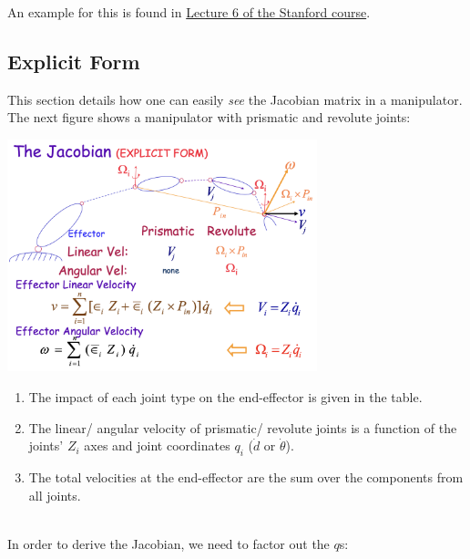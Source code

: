 An example for this is found in \href{https://youtu.be/fwHc0a8DMQ0?t=4040}{Lecture 6 of the Stanford course}.

\subsection{Explicit Form}

This section details how one can easily \textit{see} the Jacobian matrix in a manipulator. The next figure shows a manipulator with prismatic and revolute joints:
\\

\begin{minipage}[c]{0.5\textwidth}
	\includegraphics[width=9cm]{sections/imgs/4_jacobian_explicit_form.png} 
\end{minipage}
\hfill
\begin{minipage}[c]{0.5\textwidth}
	\begin{center}
	\begin{enumerate}
		\item The impact of each joint type on the end-effector is given in the table.
		\item The linear/ angular velocity of prismatic/ revolute joints is a function of the joints' $Z_i$ axes and joint coordinates $q_i$ ($\dot d$ or $\dot \theta$).
		\item The total velocities at the end-effector are the sum over the components from all joints.
	\end{enumerate}
	\end{center}
\end{minipage}
\\

In order to derive the Jacobian, we need to factor out the $q$s:\\

